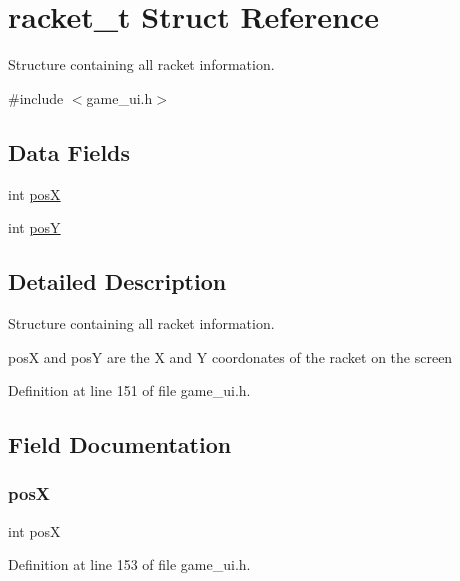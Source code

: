 \hypertarget{structracket__t}{}\section{racket\+\_\+t Struct Reference}
\label{structracket__t}


Structure containing all racket information.  




{\ttfamily \#include $<$game\+\_\+ui.\+h$>$}

\subsection*{Data Fields}
\begin{DoxyCompactItemize}
\item 
int \hyperlink{structracket__t_ab34f89ef94db9dd6d3a04425dd6d9c9d}{posX}
\item 
int \hyperlink{structracket__t_a65ab2de052c17234c8a1db3fd3b868a9}{posY}
\end{DoxyCompactItemize}


\subsection{Detailed Description}
Structure containing all racket information. 

posX and posY are the X and Y coordonates of the racket on the screen 

Definition at line 151 of file game\+\_\+ui.\+h.



\subsection{Field Documentation}
\mbox{\label{structracket__t_ab34f89ef94db9dd6d3a04425dd6d9c9d}} 
\subsubsection{\texorpdfstring{posX}{posX}}
{\footnotesize\ttfamily int posX}



Definition at line 153 of file game\+\_\+ui.\+h.

\mbox{\label{structracket__t_a65ab2de052c17234c8a1db3fd3b868a9}} 
